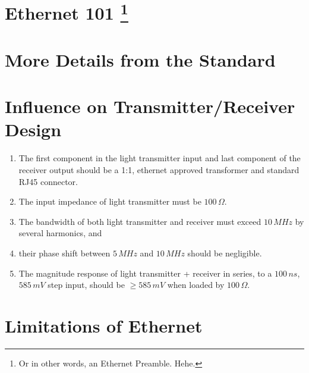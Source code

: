 \documentclass{article}
\begin{document}
\section*{Ethernet 101 \footnote{Or in other words, an Ethernet Preamble. Hehe.}}

\section*{More Details from the Standard}



\section*{Influence on Transmitter/Receiver Design}

\begin{enumerate}
\item The first component in the light transmitter input
and last component of the receiver output should be a 1:1, ethernet approved
transformer and standard RJ45 connector.
\item The input impedance of light transmitter must be $100\,\Omega$.
\item The bandwidth of both light transmitter and receiver must exceed $10\,MHz$
by several harmonics, and
\item their phase shift between $5\,MHz$ and $10\,MHz$ should be negligible.
\item The magnitude response of light transmitter + receiver in series,
to a $100\,ns$, $585\,mV$ step input, should be $\geq585\,mV$ when loaded by $100\,\Omega$.
\end{enumerate}

\section*{Limitations of Ethernet}
\end{document}

